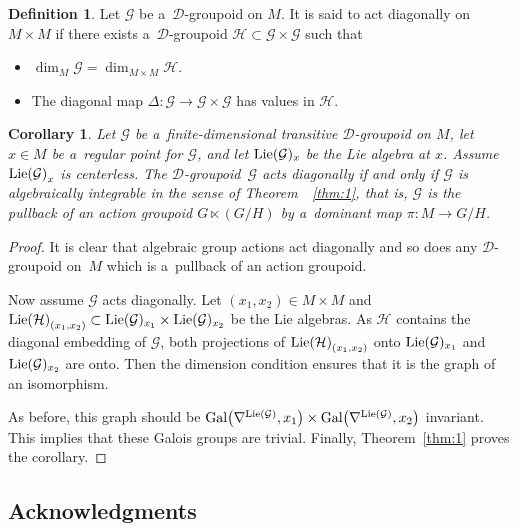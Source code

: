 \documentclass[pdftex]{sigma}
\numberwithin{equation}{section}
\newtheorem{Corollary}[Theorem]{Corollary}
\theoremstyle{definition}
\newtheorem{Definition}[Theorem]{Definition}
\begin{document}
\begin{Definition}
Let $\mathcal G$ be a~$\mathcal D$-groupoid on $M$. It is said to act diagonally on $M\times M$ if there exists a~$\mathcal D$-groupoid $\mathcal H \subset \mathcal G \times \mathcal G$ such that
\begin{itemize}\itemsep=0pt
\item[(a)] $\dim_M \mathcal G = \dim_{M\times M} \mathcal H$.
\item[(b)] The diagonal map $\Delta\colon \mathcal G \to \mathcal G \times \mathcal G$ has values in $\mathcal H$.
\end{itemize}
\end{Definition}

\begin{Corollary}\label{corollary16}
Let $\mathcal G$ be a~finite-dimensional transitive $\mathcal D$-groupoid on $M$, let $x\in M$ be a~regular point for $\mathcal G$, and let ${\rm Lie}(\mathcal G)_x$ be the Lie algebra at $x$. Assume ${{\rm Lie}(\mathcal G)}_x$ is centerless.
 The $\mathcal D$-groupoid~$\mathcal G$ acts diagonally if and only if $ \mathcal G$ is algebraically integrable in the sense of Theorem~{\rm~\ref{thm:1}}, that is, $\mathcal G$ is the pullback of an action groupoid $G\ltimes (G/H)$ by a~dominant map $\pi\colon M\to G/H$.
\end{Corollary}
\begin{proof}
It is clear that algebraic group actions act diagonally and so does any $\mathcal D$-groupoid on~$M$ which is a~pullback of an action groupoid.

Now assume $\mathcal G$ acts diagonally. Let $(x_1,x_2)\in M \times M$ and ${{\rm Lie}(\mathcal H)}_{(x_1,x_2)} \subset {\rm Lie}(\mathcal G)_{x_1} \times {\rm Lie}(\mathcal G)_{x_2}$ be the Lie algebras. As $\mathcal H$ contains the diagonal embedding of $\mathcal G$, both projections of ${{\rm Lie}(\mathcal H)}_{(x_1,x_2)}$ onto ${\rm Lie}(\mathcal G)_{x_1}$ and ${\rm Lie}(\mathcal G)_{x_2}$ are onto. Then the dimension condition ensures that it is the graph of an isomorphism.

As before, this graph should be ${\rm Gal}\bigl(\nabla^{{\rm Lie}(\mathcal G)},x_1\bigr) \times {\rm Gal}\bigl(\nabla^{{\rm Lie}(\mathcal G)},x_2\bigr)$ invariant. This implies that these Galois groups are trivial. Finally, Theorem~\ref{thm:1} proves the corollary.
\end{proof}

\subsection*{Acknowledgments}
\end{document}
